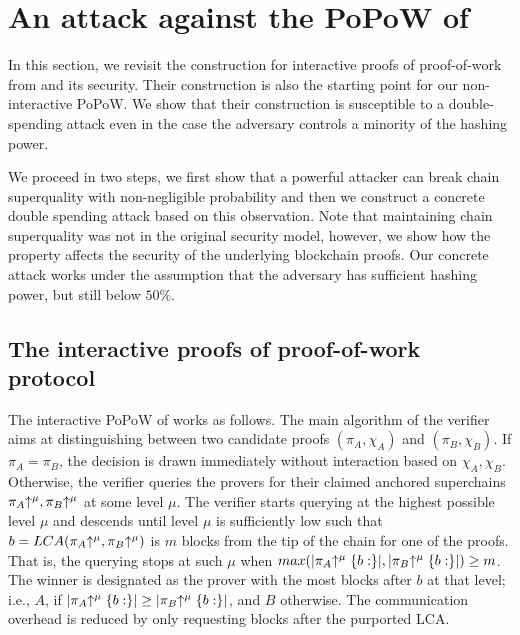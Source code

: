 \section{An attack against the PoPoW of \cite{KLS}}
\label{sec:attack}

In this section, we revisit the construction for interactive proofs of
proof-of-work from \cite{KLS} and its security.  Their construction is also the
starting point for our non-interactive PoPoW. We show that their construction is
susceptible to  a double-spending attack even in the case the adversary controls
a minority of the hashing power.

We proceed in two steps, we first show that a powerful attacker can break chain
superquality with non-negligible probability and then we construct a concrete
double spending  attack based on this observation. Note that maintaining   chain
superquality was  not in the original security model,  however, we show how the
property affects the security of the underlying blockchain proofs. Our  concrete
attack works under the assumption that the adversary has sufficient hashing
power, but still below $50\%$.

\subsection{The interactive proofs of proof-of-work protocol}
The interactive PoPoW of \cite{KLS} works as follows. The main algorithm of the
verifier aims at distinguishing between two candidate proofs $(\pi_A, \chi_A)$
and $(\pi_B, \chi_B)$. If $\pi_A = \pi_B$, the decision is drawn immediately
without interaction based on $\chi_A,\chi_B$. Otherwise, the verifier queries
the provers for their claimed anchored superchains $\pi_A\negthickspace\uparrow^\mu,
\pi_B\negthickspace\uparrow^\mu$ at some level $\mu$. The verifier starts querying at the
highest possible level $\mu$ and descends until level $\mu$ is sufficiently low
such that $b = LCA(\pi_A\negthickspace\uparrow^\mu, \pi_B\negthickspace\uparrow^\mu)$ is $m$ blocks from the
tip of the chain for one of the proofs. That is, the querying stops at such
$\mu$ when $max(|\pi_A\negthickspace\uparrow^\mu\{b:\}|, |\pi_B\negthickspace\uparrow^\mu\{b:\}|) \geq m$.
The winner is designated as the prover with the most blocks after $b$ at that
level; i.e., $A$, if $|\pi_A\negthickspace\uparrow^\mu\{b:\}| \geq |\pi_B\negthickspace\uparrow^\mu\{b:\}|$,
and $B$ otherwise. The communication overhead is reduced by only requesting
blocks after the purported LCA.

